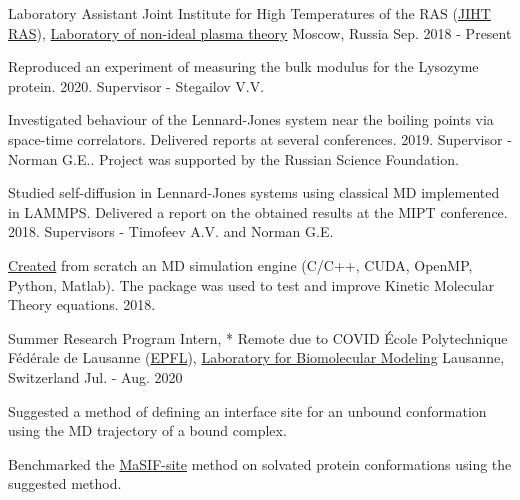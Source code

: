 

\begin{cventries}

  \cventry
    {Laboratory Assistant} %
    {Joint Institute for High Temperatures of the RAS (\href{https://jiht.ru/en/}{JIHT RAS}), \href{https://jiht.ru/staff/structure.php?set_filter_structure=Y&structure_UF_DEPARTMENT=257}{Laboratory of non-ideal plasma theory}} %
    {Moscow, Russia} %
    {Sep. 2018 - Present} %
    {
      \begin{cvitems} %
        \item {Reproduced an experiment of measuring the bulk modulus for the Lysozyme protein. 2020. Supervisor - Stegailov V.V.}
        \item {Investigated behaviour of the Lennard-Jones system near the boiling points via space-time correlators. Delivered reports at several conferences. 2019. Supervisor - Norman G.E.. Project was supported by the Russian Science Foundation.}
      	\item {Studied self-diffusion in Lennard-Jones systems using classical MD implemented in LAMMPS. Delivered a report on the obtained results at the MIPT conference. 2018. Supervisors - Timofeev A.V. and Norman G.E. }
      	\item {\href{https://github.com/PolyachenkoYA/molecules}{Created} from scratch an MD simulation engine (C/C++, CUDA, OpenMP, Python, Matlab). The package was used to test and improve Kinetic Molecular Theory equations.  2018.}
      \end{cvitems}
    }
    
  \cventry
    {Summer Research Program Intern, * Remote due to COVID} %
    {École Polytechnique Fédérale de Lausanne (\href{https://www.epfl.ch/en/}{EPFL}), \hspace{5pt}  \href{https://www.epfl.ch/labs/lbm/}{Laboratory for Biomolecular Modeling}} %
    {Lausanne, Switzerland} %
    {Jul. - Aug. 2020} %
    {
      \begin{cvitems} %
		\item{Suggested a method of defining an interface site for an unbound conformation using the MD trajectory of a bound complex.}
        \item {Benchmarked the \href{https://www.nature.com/articles/s41592-019-0666-6}{MaSIF-site} method on solvated protein conformations using the suggested method.}
      \end{cvitems}
    }
    

\end{cventries}
